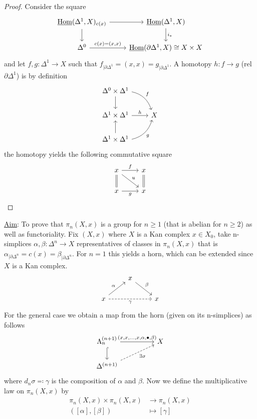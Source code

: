 \begin{proof}
    Consider the square
    \[
    \begin{tikzcd}
        \underline{\Hom}(\Delta^1, X)_{c(x)} 
        \ar[r]
        \ar[d]
        &
        \underline{\Hom}(\Delta^1, X)
        \ar[d, "i_*"]
        \\
        \Delta^0
        \ar[r, "{c(x)=(x,x)}"]
        &
        \underline{\Hom}(\partial \Delta^1, X) \cong X \times X
    \end{tikzcd}
    \]
    and let $f,g\colon \Delta^1 \to X$ such that $f_{\mid \partial \Delta^1}=(x,x)=g_{\mid \partial \Delta^1}$. 
    A homotopy $h\colon f \to g$ (rel $\partial \Delta^1$) is by definition 
    \[
    \begin{tikzcd}
        \Delta^{0}\times \Delta^{1}
        \ar[d]
        \ar[rd, bend left, "f"]
        &
        \\
        \Delta^1 \times \Delta^1
        \ar[r, "h"]
        &
        X
        \\
        \Delta^{1} \times \Delta^1
        \ar[u]
        \ar[ru, bend right, "g"']
    \end{tikzcd}
    \]
    the homotopy yields the following commutative square 
    \[
    \begin{tikzcd}
        x 
        \ar[r, "f"]
        \ar[d, equal]
        \ar[rd, "u"]
        &
        x
        \ar[d, equal]
        \\
        x
        \ar[r, "g"']
        &
        x
    \end{tikzcd}
    \]
\end{proof}

\underline{Aim}: To prove that $\pi_n(X,x)$ is a group for $n \geq 1$ (that is abelian for $n \geq 2$) as well as functoriality.
Fix $(X,x)$ where $X$ is a Kan complex $x \in X_0$, take n-simplices $\alpha, \beta  \colon  \Delta^n \to X$ representatives of classes in $\pi_n(X,x)$ that is $\alpha_{\mid \partial \Delta^n}= c(x) = \beta_{\mid \partial \Delta^n}$.
For $n=1$ this yields a horn, which can be extended since $X$ is a Kan complex. 
\[
\begin{tikzcd}
    &
    x
    \ar[rd, "\beta"]
    &
    \\
    x
    \ar[ru, "\alpha"]
    \ar[rr, dashed, "\gamma"']
    &&
    x
\end{tikzcd}
\]
For the general case we obtain a map from the horn (given on its n-simplices) as follows 
\[
\begin{tikzcd}
    \Lambda_n^{(n+1)}
    \ar[rr,"{(x,x,\dotsc,x,\alpha,\bullet,\beta)}"]
    \ar[d, hook]
    &&
    X
    \\
    \Delta^{(n+1)}
    \ar[rru, dashed, "\exists \sigma"']
    &&
\end{tikzcd}
\]
where $d_n\sigma\eqqcolon \gamma$ is the composition of $\alpha$ and $\beta$.
Now we define the multiplicative law on $\pi_n(X,x)$ by 
\begin{align*}
    \pi_n(X,x) \times \pi_n(X,x)& \to \pi_n(X,x)\\
    ([\alpha],[\beta])& \mapsto[\gamma]
\end{align*}

